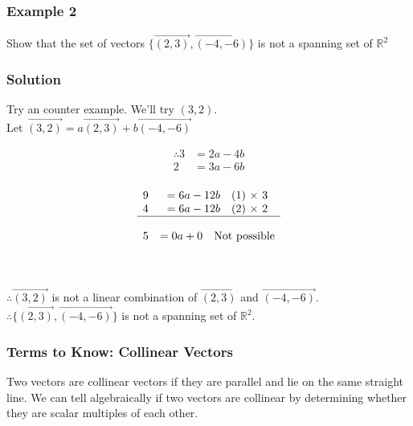 \documentclass{article}
\begin{document}
\subsubsection*{Example 2}
Show that the set of vectors \(\{\overrightarrow{(2,3)}, \overrightarrow{(-4,-6)}\}\) is not a spanning set of $\mathbb{R}^2$
\subsubsection*{Solution}
Try an counter example. We'll try $(3,2)$.\\
Let $\overrightarrow{(3,2)}=a\overrightarrow{(2,3)}+b\overrightarrow{(-4,-6)}$\\
\begin{minipage}[t]{0.5\textwidth}
\begin{align*}
    \therefore 3&=2a-4b\\
    2&=3a-6b\\
\end{align*}    
\end{minipage}
\begin{minipage}[t]{0.5\textwidth}
$$
\begin{array}{ccccc}
    9&=6a-12b \quad \text{(1) $\times$ 3}\\
    4&=6a-12b \quad \text{(2) $\times$ 2}\\
    \hline\\
    5&=0a+0 \quad \text{Not possible} 
\end{array}
$$    
\end{minipage}
\\\\
$\therefore \overrightarrow{(3,2)}$ is not a linear combination of $\overrightarrow{(2,3)}$ and $\overrightarrow{(-4,-6)}$.\\
$\therefore \{\overrightarrow{(2,3)}, \overrightarrow{(-4,-6)}\}$ is not a spanning set of $\mathbb{R}^2$.

\subsubsection{Terms to Know: Collinear Vectors}
Two vectors are collinear vectors if they are parallel and lie on the same straight line. We can tell algebraically if two vectors are collinear by determining whether they are scalar multiples of each other.
\end{document}
